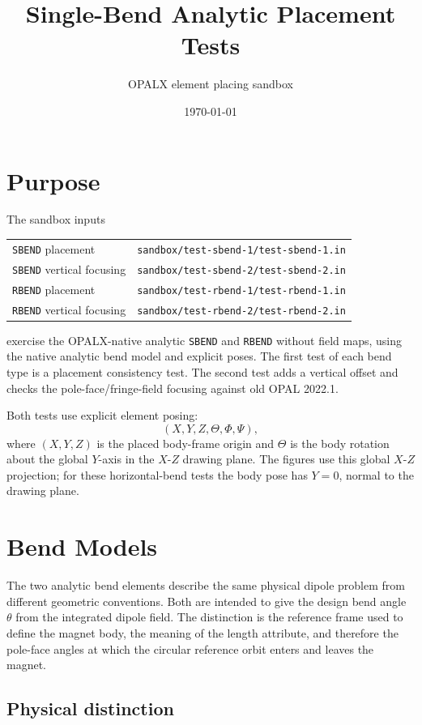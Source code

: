 \documentclass[11pt]{article}
\title{Single-Bend Analytic Placement Tests}
\author{OPALX element placing sandbox}
\date{\today}
\newcommand{\code}[1]{\texttt{#1}}
\begin{document}
\maketitle

\section{Purpose}

The sandbox inputs
\begin{center}
\begin{tabular}{@{}ll@{}}
\code{SBEND} placement & \code{sandbox/test-sbend-1/test-sbend-1.in} \\
\code{SBEND} vertical focusing & \code{sandbox/test-sbend-2/test-sbend-2.in} \\
\code{RBEND} placement & \code{sandbox/test-rbend-1/test-rbend-1.in} \\
\code{RBEND} vertical focusing & \code{sandbox/test-rbend-2/test-rbend-2.in}
\end{tabular}
\end{center}
exercise the OPALX-native analytic \code{SBEND} and \code{RBEND} without field
maps, using the native analytic bend model and explicit poses.  The first test
of each bend type is a placement consistency test.  The second test adds a
vertical offset and checks the pole-face/fringe-field focusing against old
OPAL 2022.1.

Both tests use explicit element posing:
\[
  (X,Y,Z,\Theta,\Phi,\Psi),
\]
where \((X,Y,Z)\) is the placed body-frame origin and \(\Theta\) is the body
rotation about the global \(Y\)-axis in the \(X\)-\(Z\) drawing plane.  The
figures use this global \(X\)-\(Z\) projection; for these horizontal-bend tests
the body pose has \(Y=0\), normal to the drawing plane.

\section{Bend Models}

The two analytic bend elements describe the same physical dipole problem from
different geometric conventions.  Both are intended to give the design bend
angle \(\theta\) from the integrated dipole field.  The distinction is the
reference frame used to define the magnet body, the meaning of the length
attribute, and therefore the pole-face angles at which the circular reference
orbit enters and leaves the magnet.

\subsection{Physical distinction}
\end{document}

